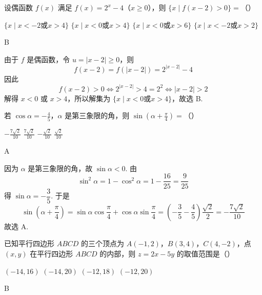 \begin{problem}
设偶函数 \( f(x) \) 满足 \( f(x) = 2^{x} - 4 \)（\(x \geqslant 0\)），则 \( \{x \mid f(x - 2) > 0\} =\)（\quad）

\choices
    {\(\{x\mid x < -2 \text{或} x > 4\}\)}
    {\(\{x\mid x < 0 \text{或} x > 4\}\)}
    {\(\{x\mid x < 0 \text{或} x > 6\}\)}
    {\(\{x\mid x < -2 \text{或} x > 2\}\)}
\end{problem}

\begin{answer}
B
\end{answer}

\begin{solution}
由于 \(f\) 是偶函数，令 \(u=|x-2|\geqslant0\)，则
\[
f(x-2)=f(|x-2|)=2^{|x-2|}-4
\]
因此
\[
f(x-2)>0
\Longleftrightarrow 2^{|x-2|}>4=2^{2}
\Longleftrightarrow |x-2|>2
\]
解得 \(x<0\) 或 \(x>4\)，所以解集为 \(\{x\mid x<0\text{或}x>4\}\)，故选 B.
\end{solution}

\begin{problem}
若 \(\cos \alpha = -\frac{4}{5}\)，\(\alpha\) 是第三象限的角，则 \(\sin \left( \alpha + \frac{\pi}{4} \right) =\)（\quad）

\choices
    {\(-\frac{7\sqrt{2}}{10}\)}
    {\(\frac{7\sqrt{2}}{10}\)}
    {\(-\frac{\sqrt{2}}{10}\)}
    {\(\frac{\sqrt{2}}{10}\)}
\end{problem}

\begin{answer}
A
\end{answer}

\begin{solution}
因为 \(\alpha\) 是第三象限的角，故 \(\sin\alpha<0\). 由
\[
\sin^{2}\alpha=1-\cos^{2}\alpha=1-\frac{16}{25}=\frac{9}{25}
\]
得 \(\sin\alpha=-\dfrac{3}{5}\). 于是
\[
\sin\left(\alpha+\frac{\pi}{4}\right)
=\sin\alpha\cos\frac{\pi}{4}+\cos\alpha\sin\frac{\pi}{4}
=\left(-\frac35-\frac45\right)\frac{\sqrt{2}}{2}
=-\frac{7\sqrt{2}}{10}
\]
故选 A.
\end{solution}

\begin{problem}
已知平行四边形 \(ABCD\) 的三个顶点为 \(A(-1,2)\)，\(B(3,4)\)，\(C(4,-2)\)，点 \((x,y)\) 在平行四边形 \(ABCD\) 的内部，则 \(z = 2x - 5y\) 的取值范围是（\quad）

\choices
    {\((-14, 16)\)}
    {\((-14, 20)\)}
    {\((-12, 18)\)}
    {\((-12, 20)\)}
\end{problem}

\begin{answer}
B
\end{answer}

